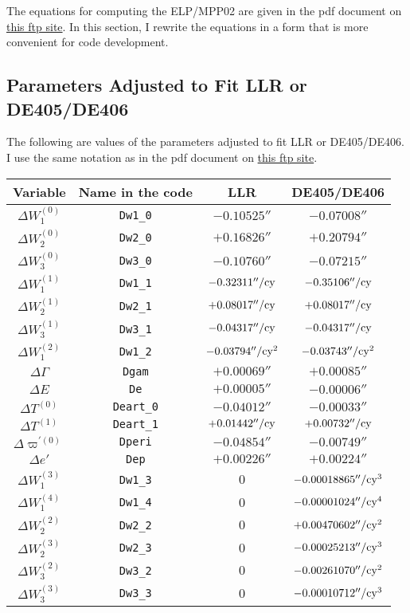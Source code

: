 \documentclass[12pt]{article}
\begin{document}
The equations for computing the ELP/MPP02 are given in the pdf document 
on \href{ftp://cyrano-se.obspm.fr/pub/2_lunar_solutions/2_elpmpp02/}{this ftp site}. 
In this section, I rewrite the equations in a form that is more convenient 
for code development.

\subsection{Parameters Adjusted to Fit LLR or DE405/DE406}

The following are values of the parameters adjusted to fit LLR or DE405/DE406. 
I use the same notation as in the pdf document on 
\href{ftp://cyrano-se.obspm.fr/pub/2_lunar_solutions/2_elpmpp02/}{this ftp site}. 
\vskip 0.5cm
\begin{tabular}{cccc} 
\hline
 {\bf Variable} & {\bf Name in the code} & {\bf LLR} & 
{\bf DE405/DE406} \\
\hline
  $\Delta W_1^{(0)}$ & {\tt Dw1\_0} & $-0.10525''$ & $-0.07008''$ \\
  $\Delta W_2^{(0)}$ & {\tt Dw2\_0} & $+0.16826''$ & $+0.20794''$ \\
  $\Delta W_3^{(0)}$ & {\tt Dw3\_0} & $-0.10760''$ & $-0.07215''$ \\
  $\Delta W_1^{(1)}$ & {\tt Dw1\_1} & $-0.32311''/{\rm cy}$ & $-0.35106''/{\rm cy}$ \\
  $\Delta W_2^{(1)}$ & {\tt Dw2\_1} & $+0.08017''/{\rm cy}$ & $+0.08017''/{\rm cy}$ \\
  $\Delta W_3^{(1)}$ & {\tt Dw3\_1} & $-0.04317''/{\rm cy}$ & $-0.04317''/{\rm cy}$ \\
  $\Delta W_1^{(2)}$ & {\tt Dw1\_2} & $-0.03794''/{\rm cy}^2$ & $-0.03743''/{\rm cy}^2$ \\
  $\Delta \Gamma$ & {\tt Dgam} & $+0.00069''$ & $+0.00085''$ \\ 
  $\Delta E$ & {\tt De} & $+0.00005''$ & $-0.00006''$ \\
  $\Delta T^{(0)}$ & {\tt Deart\_0} & $-0.04012''$ & $-0.00033''$ \\
  $\Delta T^{(1)}$ & {\tt Deart\_1} & $+0.01442''/{\rm cy}$ & $+0.00732''/{\rm cy}$ \\
  $\Delta \varpi^{'(0)}$ & {\tt Dperi} & $-0.04854''$ & $-0.00749''$ \\
  $\Delta e'$ & {\tt Dep} & $+0.00226''$ & $+0.00224''$ \\
  $\Delta W_1^{(3)}$ & {\tt Dw1\_3} & $0$ & $-0.00018865''/{\rm cy}^3$ \\
  $\Delta W_1^{(4)}$ & {\tt Dw1\_4} & $0$ & $-0.00001024''/{\rm cy}^4$ \\
  $\Delta W_2^{(2)}$ & {\tt Dw2\_2} & $0$ & $+0.00470602''/{\rm cy}^2$ \\
  $\Delta W_2^{(3)}$ & {\tt Dw2\_3} & $0$ & $-0.00025213''/{\rm cy}^3$ \\
  $\Delta W_3^{(2)}$ & {\tt Dw3\_2} & $0$ & $-0.00261070''/{\rm cy}^2$ \\
  $\Delta W_3^{(3)}$ & {\tt Dw3\_3} & $0$ & $-0.00010712''/{\rm cy}^3$ \\
\hline
\end{tabular}
\end{document}
